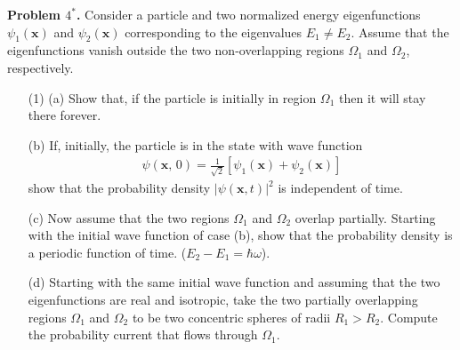 \documentclass[floatfix,nofootinbib,superscriptaddress,fleqn]{revtex4}
\begin{document}
\noindent \textbf{Problem $4^*$.}
Consider a particle and two normalized energy eigenfunctions
$\psi_1(\bm{x})$ and $\psi_2(\bm{x})$ corresponding to the eigenvalues
$E_1\neq E_2$. Assume that the eigenfunctions vanish outside the two 
non-overlapping regions $\Omega_1$ and $\Omega_2$, respectively. 
\begin{itemize}
\item[(1)] (a) Show that, if the particle is initially in region
  $\Omega_1$ then it will stay there forever. 
\item[(b)] If, initially, the particle is in the state with wave function
\begin{align*}
  \psi(\bm{x},\,0) = \frac1{\sqrt{2}} [\psi_1(\bm{x}) +
  \psi_2(\bm{x})] 
\end{align*}
show that the probability density $|\psi(\bm{x},t)|^2$ is independent
of time. 
\item[(c)] Now assume that the two regions $\Omega_1$ and $\Omega_2$
  overlap partially. Starting with the initial wave function of case
  (b), show that the probability density is a periodic function of 
time. ($E_2-E_1=\hbar \omega$).
\item[(d)] Starting with the same initial wave function and assuming
  that the two eigenfunctions are real and isotropic, take the two
  partially overlapping regions $\Omega_1$ and $\Omega_2$ to be 
two concentric spheres of radii $R_1>R_2$. Compute the probability
current that flows through $\Omega_1$.
\end{itemize}
\end{document}
